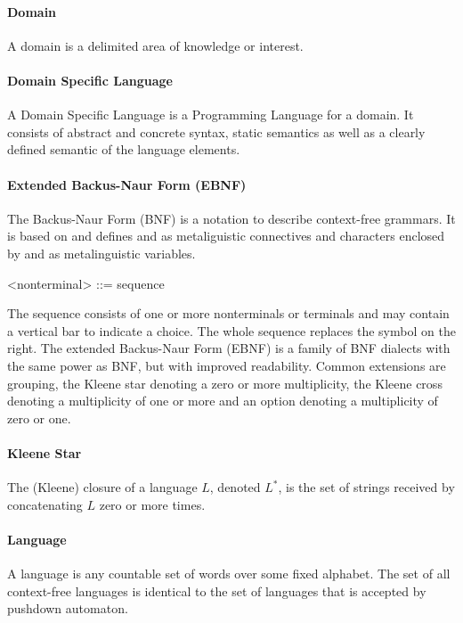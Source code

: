 \paragraph{Domain} A domain is a delimited area of knowledge or interest. \cite{MDSD}

\paragraph{Domain Specific Language} A Domain Specific Language is a Programming Language for a domain. It consists of abstract and concrete syntax, static semantics as well as a clearly defined semantic of the language elements. \cite{MDSD}

\paragraph{Extended Backus-Naur Form (EBNF)} 
The Backus-Naur Form (BNF) is a notation to describe context-free grammars. It is based on \cite{BNF} and defines \code{:=} and \code{|} as metaliguistic connectives and characters enclosed by \code{<} and \code{>} as metalinguistic variables.
\begin{xtxt}
 <nonterminal> ::= sequence
\end{xtxt}
The sequence consists of one or more nonterminals or terminals and may contain a vertical bar to indicate a choice. The whole sequence replaces the symbol on the right. The extended Backus-Naur Form (EBNF) is a family of BNF dialects with the same power as BNF, but with improved readability. Common extensions are grouping, the Kleene star denoting a zero or more multiplicity, the Kleene cross denoting a multiplicity of one or more and an option denoting a multiplicity of zero or one. \cite{ParserBook}
 
\paragraph{Kleene Star} 
The (Kleene) closure of a language $L$, denoted $L^*$, is the set of strings received by concatenating $L$ zero or more times. \cite{DragonBook}

\paragraph{Language} 
A language is any countable set of words over some fixed alphabet. The set of all context-free languages is identical to the set of languages that is accepted by pushdown automaton. \cite{DragonBook}

